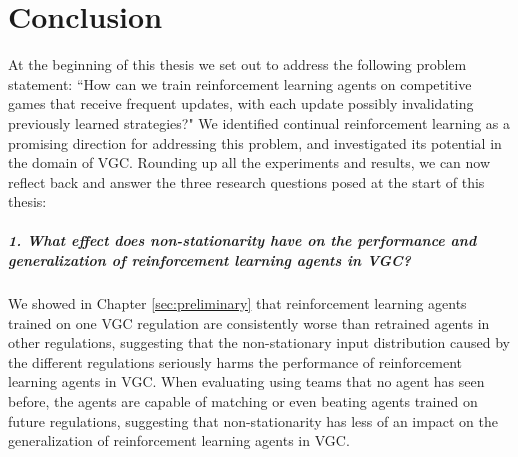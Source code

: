 %
%
\chapter{Conclusion} \label{sec:conclusion}
At the beginning of this thesis we set out to address the following problem statement: ``How can we train reinforcement learning agents on competitive games that receive frequent updates, with each update possibly invalidating previously learned strategies?"
We identified continual reinforcement learning as a promising direction for addressing this problem, and investigated its potential in the domain of VGC.
Rounding up all the experiments and results, we can now reflect back and answer the three research questions posed at the start of this thesis:

\paragraph{1. What effect does non-stationarity have on the performance and generalization of reinforcement learning agents in VGC?} We showed in Chapter \ref{sec:preliminary} that reinforcement learning agents trained on one VGC regulation are consistently worse than retrained agents in other regulations, suggesting that the non-stationary input distribution caused by the different regulations seriously harms the performance of reinforcement learning agents in VGC.
When evaluating using teams that no agent has seen before, the agents are capable of matching or even beating agents trained on future regulations, suggesting that non-stationarity has less of an impact on the generalization of reinforcement learning agents in VGC.

